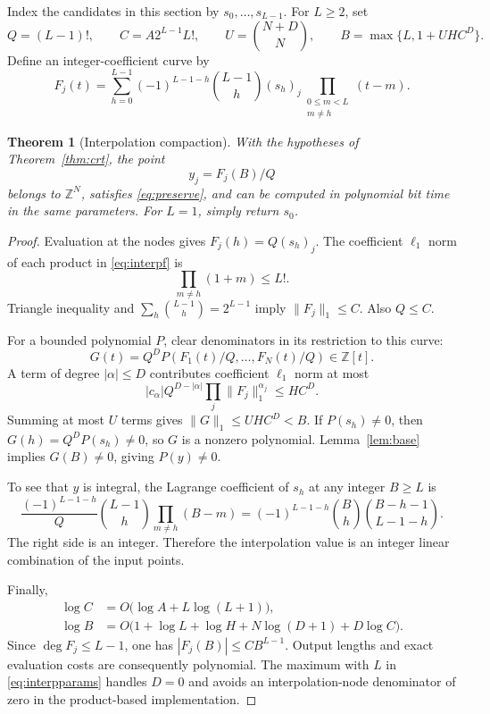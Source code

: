 \documentclass[11pt]{article}
\newtheorem{theorem}{Theorem}[section]
\theoremstyle{definition}
\theoremstyle{remark}
\newcommand{\Z}{\mathbb Z}
\begin{document}
Index the candidates in this section by $s_0,\ldots,s_{L-1}$. For $L\ge2$, set
\begin{equation}\label{eq:interpparams}
 Q=(L-1)!,\qquad C=A2^{L-1}L!,\qquad U=\binom{N+D}{N},
 \qquad B=\max\{L,1+UH C^D\}.
\end{equation}
Define an integer-coefficient curve by
\begin{equation}\label{eq:interpf}
 F_j(t)=\sum_{h=0}^{L-1}(-1)^{L-1-h}\binom{L-1}{h}(s_h)_j
             \prod_{\substack{0\le m<L\\m\ne h}}(t-m).
\end{equation}

\begin{theorem}[Interpolation compaction]\label{thm:interpolation}
With the hypotheses of Theorem~\ref{thm:crt}, the point
\[
 y_j=F_j(B)/Q
\]
belongs to $\Z^N$, satisfies \eqref{eq:preserve}, and can be computed in polynomial bit time in the same parameters. For $L=1$, simply return $s_0$.
\end{theorem}
\begin{proof}
Evaluation at the nodes gives $F_j(h)=Q(s_h)_j$. The coefficient $\ell_1$ norm of each product in \eqref{eq:interpf} is
\[
 \prod_{m\ne h}(1+m)\le L!.
\]
Triangle inequality and $\sum_h\binom{L-1}{h}=2^{L-1}$ imply $\|F_j\|_1\le C$. Also $Q\le C$.

For a bounded polynomial $P$, clear denominators in its restriction to this curve:
\[
 G(t)=Q^D P(F_1(t)/Q,\ldots,F_N(t)/Q)\in\Z[t].
\]
A term of degree $|\alpha|\le D$ contributes coefficient $\ell_1$ norm at most
\[
 |c_\alpha|Q^{D-|\alpha|}\prod_j\|F_j\|_1^{\alpha_j}\le H C^D.
\]
Summing at most $U$ terms gives $\|G\|_1\le UH C^D<B$. If $P(s_h)\ne0$, then $G(h)=Q^D P(s_h)\ne0$, so $G$ is a nonzero polynomial. Lemma~\ref{lem:base} implies $G(B)\ne0$, giving $P(y)\ne0$.

To see that $y$ is integral, the Lagrange coefficient of $s_h$ at any integer $B\ge L$ is
\begin{equation}\label{eq:intlagrange}
 \frac{(-1)^{L-1-h}}{Q}\binom{L-1}{h}\prod_{m\ne h}(B-m)
 =(-1)^{L-1-h}\binom{B}{h}\binom{B-h-1}{L-1-h}.
\end{equation}
The right side is an integer. Therefore the interpolation value is an integer linear combination of the input points.

Finally,
\begin{align*}
 \log C&=O\bigl(\log A+L\log(L+1)\bigr),\\
 \log B&=O\bigl(1+\log L+\log H+N\log(D+1)+D\log C\bigr).
\end{align*}
Since $\deg F_j\le L-1$, one has $|F_j(B)|\le C B^{L-1}$. Output lengths and exact evaluation costs are consequently polynomial. The maximum with $L$ in \eqref{eq:interpparams} handles $D=0$ and avoids an interpolation-node denominator of zero in the product-based implementation.
\end{proof}
\end{document}
